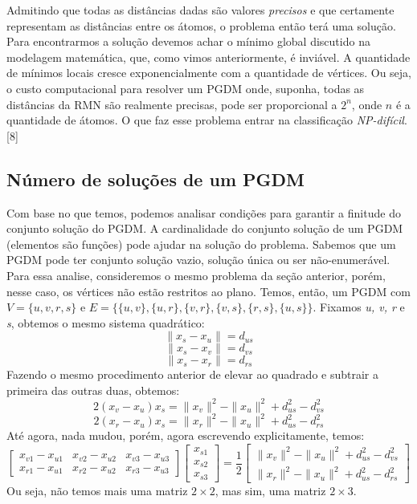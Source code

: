 \documentclass[a4paper,12pt]{article}
\begin{document}
	Admitindo que todas as distâncias dadas são valores \textit{precisos} e que certamente representam as distâncias entre os átomos, o problema então terá uma solução. Para encontrarmos a solução devemos achar o mínimo global discutido na modelagem matemática, que, como vimos anteriormente, é inviável. A quantidade de mínimos locais cresce exponencialmente com a quantidade de vértices. Ou seja, o custo computacional para resolver um PGDM onde, suponha, todas as distâncias da RMN são realmente precisas, pode ser proporcional a $2^n$, onde $n$ é a quantidade de átomos. O que faz esse problema entrar na classificação \textit{NP-difícil}. [8]
	\\
	\subsection{Número de soluções de um PGDM}
	Com base no que temos, podemos analisar condições para garantir a finitude do conjunto solução do PGDM. A cardinalidade do conjunto solução de um PGDM (elementos são funções) pode ajudar na solução do problema. Sabemos que um PGDM pode ter conjunto solução vazio, solução única ou ser não-enumerável. Para essa analise, consideremos o mesmo problema da seção anterior, porém, nesse caso, os vértices não estão restritos ao plano. Temos, então, um PGDM com $V=\{u, v, r, s\}$ e $E=\{\{u,v\}, \{u, r\}, \{v, r\}, \{v, s\}, \{r, s\}, \{u, s\}\}$. Fixamos \textit{u, v, r} e \textit{s}, obtemos o mesmo sistema quadrático:
	$$
	\|x_{s} - x_{u}\|= d_{us}
	$$
	$$
	\|x_{s} - x_{v}\|= d_{vs}
	$$
	$$
	\|x_{s} - x_{r}\|= d_{rs}
	$$
	Fazendo o mesmo procedimento anterior de elevar ao quadrado e subtrair a primeira das outras duas, obtemos:
	$$
	2(x_{v} - x_{u})x_{s} = \|x_{v}\|^{2} - \|x_{u}\|^{2} + d_{us}^{2} - d_{vs}^{2}
	$$
	$$
	2(x_{r} - x_{u})x_{s} = \|x_{r}\|^{2} - \|x_{u}\|^{2} + d_{us}^{2} - d_{rs}^{2}
	$$
	Até agora, nada mudou, porém, agora escrevendo explicitamente, temos:
	$$
	\begin{bmatrix}
	x_{v1} - x_{u1} & x_{v2} - x_{u2} & x_{v3} - x_{u3}\\
	x_{r1} - x_{u1} & x_{r2} - x_{u2} & x_{r3} - x_{u3}
	\end{bmatrix}
	\begin{bmatrix}
	x_{s1}\\
	x_{s2}\\
	x_{s3}
	\end{bmatrix} =
	\frac{1}{2}\begin{bmatrix}
	\|x_{v}\|^{2} - \|x_{u}\|^{2} + d_{us}^{2} - d_{vs}^{2}\\
	\|x_{r}\|^{2} - \|x_{u}\|^{2} + d_{us}^{2} - d_{rs}^{2}
	\end{bmatrix}
	$$
	Ou seja, não temos mais uma matriz $2 \times 2$, mas  sim, uma matriz $2 \times 3$.
	
\end{document}
